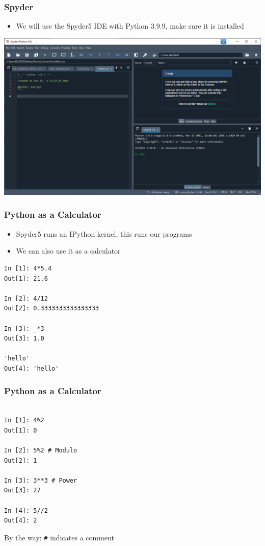 \documentclass[ngerman]{beamer}
\begin{document}
\begin{frame}
\frametitle{Spyder}

\begin{itemize}
	\item We will use the Spyder5 IDE with Python 3.9.9, make sure it is installed
\end{itemize}

\begin{center}
\includegraphics[width=\textwidth]{Pictures/Spyder5}
\end{center}

\end{frame}

\begin{frame}[fragile]
\frametitle{Python as a Calculator}

\begin{itemize}
\item Spyder5 runs an IPython kernel, this runs our programs
\item We can also use it as a calculator
\end{itemize}

\begin{lstlisting}[style=Python]
In [1]: 4*5.4
Out[1]: 21.6

In [2]: 4/12
Out[2]: 0.3333333333333333

In [3]: _*3
Out[3]: 1.0

'hello'
Out[4]: 'hello'
\end{lstlisting}

\end{frame}


\begin{frame}[fragile]
\frametitle{Python as a Calculator}

\begin{lstlisting}[style=Python]

In [1]: 4%2
Out[1]: 0

In [2]: 5%2 # Modulo
Out[2]: 1

In [3]: 3**3 # Power
Out[3]: 27

In [4]: 5//2
Out[4]: 2
\end{lstlisting}

By the way: \texttt{\#} indicates a comment

\end{frame}
\end{document}
